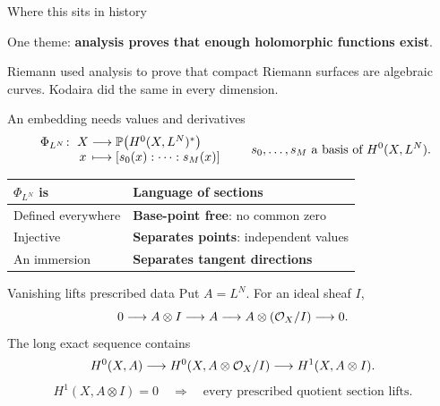 \begin{frame}{Where this sits in history}
\begin{center}
\end{center}
\par\bigskip
One theme: \textbf{analysis proves that enough holomorphic functions exist}.
\par\medskip
Riemann used analysis to prove that compact Riemann surfaces are algebraic curves.
Kodaira did the same in every dimension.
\end{frame}

\begin{frame}{An embedding needs values and derivatives}
\[
\begin{array}{r@{\;}c@{\;}c@{\;}l}
\Phi_{L^N}\colon & X & \longrightarrow & \Pj\bigl(H^0(X,L^N)^*\bigr)\\
& x & \longmapsto & [s_0(x):\cdots:s_M(x)]
\end{array}
\qquad s_0,\ldots,s_M \text{ a basis of } H^0(X,L^N).
\]
\begin{center}
\renewcommand{\arraystretch}{1.8}
\begin{tabular}{ll}
\(\Phi_{L^N}\) is & Language of sections\\
\hline
Defined everywhere & \textbf{Base-point free}: no common zero\\
Injective & \textbf{Separates points}: independent values\\
An immersion & \textbf{Separates tangent directions}
\end{tabular}
\end{center}
\end{frame}

\begin{frame}{Vanishing lifts prescribed data}
Put \(A=L^N\). For an ideal sheaf \(I\),
\[
0\longrightarrow A\otimes I\longrightarrow A
\longrightarrow A\otimes(\mathcal O_X/I)\longrightarrow0.
\]
The long exact sequence contains
\[
H^0(X,A)\longrightarrow H^0(X,A\otimes\mathcal O_X/I)
\longrightarrow H^1(X,A\otimes I).
\]
\[
\boxed{H^1(X,A\otimes I)=0
\quad\Longrightarrow\quad\text{every prescribed quotient section lifts}.}
\]
\end{frame}

